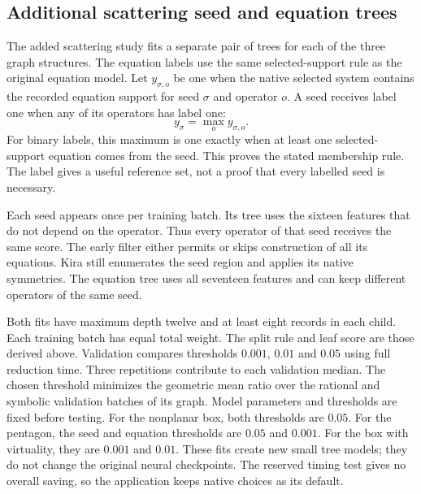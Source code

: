 \subsection{Additional scattering seed and equation trees}
The added scattering study fits a separate pair of trees for each of the three graph structures. The equation labels use the same selected-support rule as the original equation model. Let $y_{\sigma,o}$ be one when the native selected system contains the recorded equation support for seed $\sigma$ and operator $o$. A seed receives label one when any of its operators has label one:
\begin{equation}
 y_\sigma=\max_o y_{\sigma,o}.
 \label{eq:adapted-seed-label}
\end{equation}
For binary labels, this maximum is one exactly when at least one selected-support equation comes from the seed. This proves the stated membership rule. The label gives a useful reference set, not a proof that every labelled seed is necessary.

Each seed appears once per training batch. Its tree uses the sixteen features that do not depend on the operator. Thus every operator of that seed receives the same score. The early filter either permits or skips construction of all its equations. Kira still enumerates the seed region and applies its native symmetries. The equation tree uses all seventeen features and can keep different operators of the same seed.

Both fits have maximum depth twelve and at least eight records in each child. Each training batch has equal total weight. The split rule and leaf score are those derived above. Validation compares thresholds $0.001$, $0.01$ and $0.05$ using full reduction time. Three repetitions contribute to each validation median. The chosen threshold minimizes the geometric mean ratio over the rational and symbolic validation batches of its graph. Model parameters and thresholds are fixed before testing. For the nonplanar box, both thresholds are $0.05$. For the pentagon, the seed and equation thresholds are $0.05$ and $0.001$. For the box with virtuality, they are $0.001$ and $0.01$. These fits create new small tree models; they do not change the original neural checkpoints. The reserved timing test gives no overall saving, so the application keeps native choices as its default.

